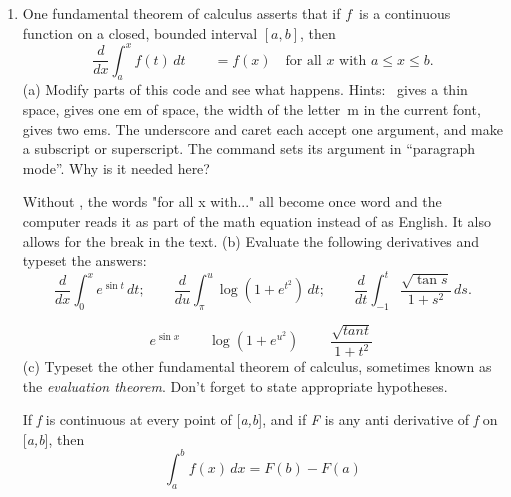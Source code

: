 \begin{enumerate}
  Hint: The macro  gives a plus-or-minus sign.\footnote{The
    tilde character is a \emph{tie} or \emph{non-breaking
      space}. Using ties is a little fussy, but helps distinguish
    professional typography. Use a tie where a line break would
    interrupt the reader's attention.}

  \soln \[
  x=\frac{-b\pm\sqrt{b^2-4ac}}{2a}
\]
\item One fundamental theorem of calculus asserts that if $f$~is a
  continuous function on a closed, bounded interval $[a, b]$, then
  \[
  \frac{d}{dx} \int_{a}^{x} f(t)\, dt \qquad = f(x)
  \quad\text{for all~$x$ with $a \leq x \leq b$.}
  \]
  (a) Modify parts of this code and see what happens. Hints:
  \Cmd{,}~gives a thin space,  gives one em of space, the
  width of the letter~m in the current font,  gives two
  ems. The underscore and caret each accept one argument, and make a
  subscript or superscript. The  command sets its argument
  in ``paragraph mode''. Why is it needed here?
  
  \soln Without , the words "for all x with..." all become once word and the computer reads it as part of the math equation instead of as English. It also allows for the break in the text. 
  (b) Evaluate the following derivatives and typeset the answers:
  \[
  \frac{d}{dx} \int_{0}^{x} e^{\sin t}\, dt;\qquad
  \frac{d}{du} \int_{\pi}^{u} \log(1 + e^{t^{2}})\, dt;\qquad
  \frac{d}{dt} \int_{-1}^{t} \frac{\sqrt{\tan s}}{1 + s^{2}}\, ds.
  \]

  \soln \[
  e^{\sin x} \qquad \log(1+e^{u^{2}})\ \qquad \frac{\sqrt{tan t}}{1+t^{2}}\ 
\]
  (c) Typeset the other fundamental theorem of calculus, sometimes
  known as the \emph{evaluation theorem}. Don't forget to state
  appropriate hypotheses.

  \soln If \emph{f} is continuous at every point of [\emph{a,b}], and if \emph{F} is any anti derivative of \emph{f} on [\emph{a,b}], then 
  \[
\int_{a}^{b} f(x)\, dx = F(b)-F(a)
\]
\end{enumerate}

